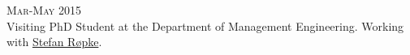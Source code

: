 \begin{paracol}{2}
  \textsc{Mar-May 2015}
\switchcolumn
  \\
  Visiting PhD Student at the Department of Management Engineering. Working with \href{https://scholar.google.com/citations?user=sYi141QAAAAJ}{Stefan Røpke}.
\end{paracol}

%

%
